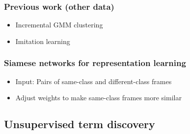 \documentclass[british]{beamer}
\begin{document}
  \begin{frame}
    \frametitle{Previous work (other data)}
    
    \begin{itemize}
    \item Incremental GMM clustering
   \item Imitation learning
   \end{itemize}
    
 \end{frame}
  
  \begin{frame}
    \frametitle{Siamese networks for representation learning}
    
    \begin{itemize}
     \item Input: Pairs of same-class and different-class frames
     \item Adjust weights to make same-class frames more similar
    \end{itemize}

    \centering
    
  \end{frame}

  \subsection{Unsupervised term discovery}
  
\end{document}
